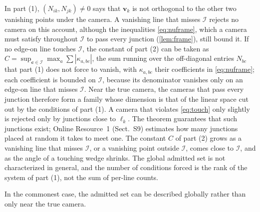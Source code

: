 \documentclass[pdflatex,sn-mathphys-num,iicol]{sn-jnl}
\newcommand{\vc}{\mathbf{c}}
\newcommand{\vv}{\mathbf{v}}
\newcommand{\OR}{Online Resource~1}
\theoremstyle{thmstyleone}
\theoremstyle{thmstylethree}
\theoremstyle{thmstyletwo}
\begin{document}
In part (1), $(N_{ik},N_{jk})\neq0$ says that $\vv_k$ is not orthogonal to the other two vanishing points under the camera. A vanishing line that misses $\mathcal I$ rejects no camera on this account, although the inequalities \eqref{eq:nuframe}, which a camera must satisfy throughout $\mathcal I$ to pass every junction (\cref{lem:frame}), still bound it. If no edge-on line touches $\mathcal I$, the constant of part (2) can be taken as $C=\sup_{\vc\in\mathcal I}\max_a\sum|\kappa_{a,bc}|$, the sum running over the off-diagonal entries $N_{bc}$ that part (1) does not force to vanish, with $\kappa_{a,bc}$ their coefficients in \eqref{eq:nuframe}; each coefficient is bounded on $\mathcal I$, because its denominator vanishes only on an edge-on line that misses $\mathcal I$. Near the true camera, the cameras that pass every junction therefore form a family whose dimension is that of the linear space cut out by the conditions of part (1). A camera that violates \eqref{eq:touch} only slightly is rejected only by junctions close to $\ell_k$. The theorem guarantees that such junctions exist; \OR{} (Sect.~S9) estimates how many junctions placed at random it takes to meet one. The constant $C$ of part (2) grows as a vanishing line that misses $\mathcal I$, or a vanishing point outside $\mathcal I$, comes close to $\mathcal I$, and as the angle of a touching wedge shrinks. The global admitted set is not characterized in general, and the number of conditions forced is the rank of the system of part (1), not the sum of per-line counts.

In the commonest case, the admitted set can be described globally rather than only near the true camera.
\end{document}
